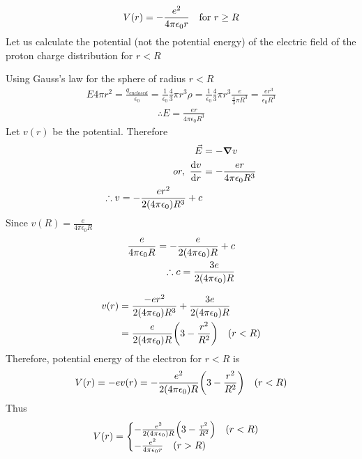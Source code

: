 \begin{enumerate}[label=Problem.\arabic*,start=1]
			\begin{align*}
				V\qty(r) = - \frac{e^2}{4 \pi \epsilon_0 r} \quad \text{for}\ r \geq R
			\end{align*}
			Let us calculate the potential (not the potential energy) of the electric field of the proton charge distribution for $r<R$
			
			Using Gauss's law for the sphere of radius $r<R$
			\begin{align*}
				E 4 \pi r^2 = \frac{q_{enclosed}}{\epsilon_0} = \frac{1}{\epsilon_0} \frac{4}{3} \pi r^3 \rho = \frac{1}{\epsilon_0} \frac{4}{3} \pi r^3 \frac{e}{\frac{4}{3} \pi R^3} = \frac{e r^3}{\epsilon_0 R^3}
			\end{align*}
			\begin{align*}
				\therefore E = \frac{e r}{4\pi \epsilon_0 R^3}
			\end{align*}
			Let $v(r)$ be the potential. Therefore 
			\begin{align*}
				\vec{E} &= - \grad{ v} \\
				or, \ \dv{v}{r} &= -\frac{e r}{4 \pi \epsilon_0 R^3} \\
				\therefore v = - \frac{e r^2}{2 \qty(4 \pi \epsilon_0) R^3} + c
			\end{align*}
			Since $v(R) = \frac{e}{4 \pi \epsilon_0 R}$
			\begin{align*}
				\frac{e}{4\pi \epsilon_0 R} = - \frac{e}{2 \qty(4 \pi \epsilon_0) R}  + c \\
				\therefore c = \frac{3 e}{2 \qty(4 \pi \epsilon_0) R}
			\end{align*}
			
			\begin{align*}
				v(r) 
				&= \frac{- e r^2}{2 \qty(4 \pi \epsilon_0) R^3} + \frac{3 e}{2 \qty(4 \pi \epsilon_0) R} \\
				&= \frac{e}{2 \qty(4 \pi \epsilon_0) R} \qty(3 - \frac{r^2}{R^2}) \quad (r < R)
			\end{align*}
			Therefore, potential energy of the electron for $r<R$ is
			\begin{align*}
				V(r) = - e v(r) = - \frac{e^2}{2 \qty(4 \pi \epsilon_0) R} \qty(3 - \frac{r^2}{R^2}) \quad (r < R)
			\end{align*}
			Thus
			\begin{equation*}
				V(r) = \begin{cases}
				- \frac{e^2}{2 \qty(4 \pi \epsilon_0) R} \qty(3 - \frac{r^2}{R^2}) \quad (r < R) \\- \frac{e^2}{4 \pi \epsilon_0 r} \quad (r > R)
				\end{cases}
			\end{equation*}
			

\end{enumerate}
